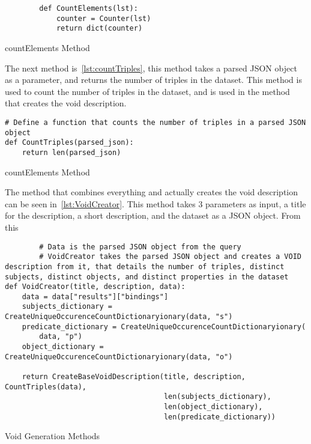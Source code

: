 \begin{listing}[htb!]
    \tiny
    \centering
    \begin{verbatim}
        def CountElements(lst):
            counter = Counter(lst)
            return dict(counter)
    \end{verbatim}
    \caption{countElements Method}
    \label{lst:countElements}
\end{listing}

The next method is~\ref{lst:countTriples}, this method takes a parsed JSON object as a parameter, and returns the number of triples in the dataset. This method is used to count the number of triples in the dataset, and is used in the method that creates the void description.

\begin{listing}[htb!]
    \tiny
    \centering
    \begin{verbatim}
# Define a function that counts the number of triples in a parsed JSON object
def CountTriples(parsed_json):
    return len(parsed_json)
    \end{verbatim}
    \caption{countElements Method}
    \label{lst:countElements}
\end{listing}

The method that combines everything and actually creates the \gls{void} description can be seen in~\ref{lst:VoidCreator}. This method takes 3 parameters as input, a title for the description, a short description, and the dataset as a JSON object. From this

\begin{listing}[htb!]
    \tiny
    \centering
    \begin{verbatim}
        # Data is the parsed JSON object from the query
        # VoidCreator takes the parsed JSON object and creates a VOID description from it, that details the number of triples, distinct subjects, distinct objects, and distinct properties in the dataset
def VoidCreator(title, description, data):
    data = data["results"]["bindings"]
    subjects_dictionary = CreateUniqueOccurenceCountDictionaryionary(data, "s")
    predicate_dictionary = CreateUniqueOccurenceCountDictionaryionary(
        data, "p")
    object_dictionary = CreateUniqueOccurenceCountDictionaryionary(data, "o")

    return CreateBaseVoidDescription(title, description, CountTriples(data),
                                     len(subjects_dictionary),
                                     len(object_dictionary),
                                     len(predicate_dictionary))
    \end{verbatim}
    \caption{Void Generation Methods}
    \label{lst:VoidCreator}
\end{listing}



